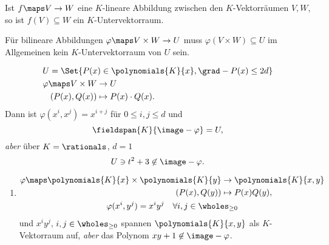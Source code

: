 \begin{erinnerung*}
  Ist \( f\maps V\to W \) eine \( K \)-lineare Abbildung zwischen den \( K \)-Vektorräumen \( V,W \), so ist \( f(V)\subseteq W \) ein \( K \)-Untervektorraum.
\end{erinnerung*}
\begin{achtung*}
  Für bilineare Abbildungen \( \varphi\maps V\times W\to U \) muss \( \varphi(V\times W)\subseteq U \) im Allgemeinen kein \( K \)-Untervektorraum von \( U \) sein.

  \begin{align*}
    \span U=\Set{P(x)\in \polynomials{K}{x},\grad-{P(x)}\leq 2d}\\
    \varphi\maps V\times W& \to U\\
    (P(x),Q(x))&\mapsto P(x)\cdot Q(x).
  \end{align*}
  Dann ist \( \varphi(x^i,x^j)=x^{i+j} \) für \( 0\leq i,j\leq d \) und
  \begin{equation*}
    \fieldspan{K}{\image-{\varphi}}=U,
  \end{equation*}
  \emph{aber} \zb über \( K=\rationals \), \( d=1 \)
  \begin{equation*}
    U\ni t^2+3\not\in \image-{\varphi}.
  \end{equation*}
\end{achtung*}
\begin{beispiel*}
  \begin{enumerate}[resume*]
    \item \label{bilinaritaet_beispiel_polynommultiplikation_gleiche_variable}\begin{align*}
      \varphi\maps \polynomials{K}{x}\times \polynomials{K}{y}&\to \polynomials{K}{x,y}\\
      (P(x),Q(y))&\mapsto P(x)Q(y),\\
      \span \varphi(x^i,y^j)=x^i y^j\quad \forall i,j\in \wholes_{\geq 0}
    \end{align*}
    und \( x^i y^j \), \( i,j\in \wholes_{\geq 0} \) spannen \( \polynomials{K}{x,y} \) als \( K \)-Vektorraum auf, \emph{aber} das Polynom \( xy+1\not\in \image-{\varphi} \).
  \end{enumerate}
\end{beispiel*}
